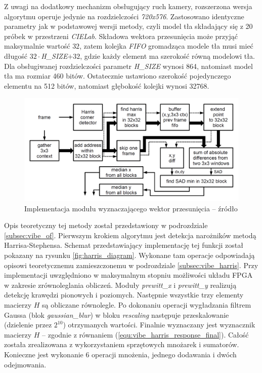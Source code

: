 Z uwagi na dodatkowy mechanizm obsługujący ruch kamery, rozszerzona wersja algorytmu operuje jedynie na rozdzielczości \textit{720x576}. %
Zastosowano identyczne parametry jak w podstawowej wersji metody, czyli model tła składający się z 20 próbek w przestrzeni \textit{CIELab}.
Składowa wektora przesunięcia może przyjąć maksymalnie wartość $32$, zatem kolejka \textit{FIFO} gromadząca modele tła musi mieć długość $32 \cdot$\textit{H\_SIZE}$+32$, gdzie każdy element ma szerokość równą modelowi tła. 
Dla obsługiwanej rozdzielczości parametr \textit{H\_SIZE} wynosi 864, natomiast model tła ma rozmiar 460 bitów. Ostatecznie ustawiono szerokość pojedynczego elementu na 512 bitów, natomiast głębokość kolejki wynosi 32768.  

	\begin{figure}[h!]
		\centering
		\includegraphics[scale=0.25]{img/4/displacement_vector_diagram.png}
		\caption{Implementacja modułu wyznaczającego wektor przesunięcia -- źródło \cite{kryjak_14_vibe}} %
		\label{fig:displacement_diagram}
	\end{figure}

Opis teoretyczny tej metody został przedstawiony w podrozdziale \ref{subsec:vibe_of}. 
Pierwszym krokiem algorytmu jest detekcja narożników metodą Harrisa-Stephensa. 
Schemat przedstawiający implementację tej funkcji został pokazany na rysunku \ref{fig:harris_diagram}. 
Wykonane tam operacje odpowiadają opisowi teoretycznemu zamieszczonemu w podrozdziale \ref{subsec:vibe_harris}. 
Przy implementacji uwzględniono w maksymalnym stopniu możliwości układu FPGA w zakresie zrównoleglania obliczeń. 
Moduły \textit{prewitt\_x} i \textit{prewitt\_y} realizują detekcję krawędzi pionowych i poziomych. 
Następnie wszystkie trzy elementy macierzy $H$ są obliczane równolegle. 
Po dokonaniu operacji wygładzania filtrem Gaussa (blok \textit{gaussian\_blur}) w bloku \textit{rescaling} następuje przeskalowanie (dzielenie przez $2^10$) otrzymanych wartości. 
Finalnie wyznaczany jest wyznacznik macierzy $H$ -- zgodnie z równaniem (\ref{equ:vibe_harris_response_final}). 
Całość została zrealizowana z wykorzystaniem sprzętowych mnożarek i sumatorów. 
Konieczne jest wykonanie 6 operacji mnożenia, jednego dodawania i dwóch odejmowania.
 
